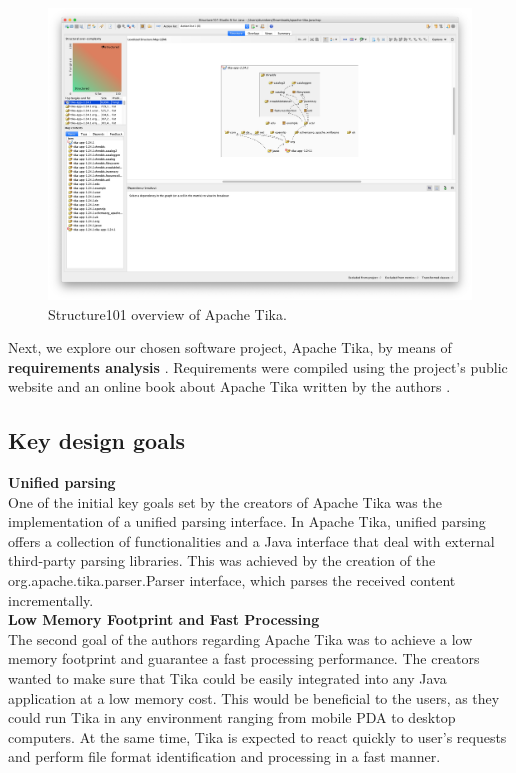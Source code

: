 \documentclass{article}
\begin{document}
\begin{figure}
    \centering
    \includegraphics[width=\textwidth]{structure101.png}
    \caption{Structure101 overview of Apache Tika.}
    \label{fig:structure101}
\end{figure}

Next, we explore our chosen software project, Apache Tika, by means of \textbf{requirements analysis} \citep{dresner1964maintenance}. Requirements were compiled using the project's public website \citep{apache_software_foundation_2020} and an online book about Apache Tika written by the authors \citep{tika_in_action}. 

\subsection{Key design goals}

\textbf{Unified parsing}\\

One of the initial key goals set by the creators of Apache Tika was the implementation of a unified parsing interface.  In Apache Tika, unified parsing offers a collection of functionalities and a Java interface that deal with external third-party parsing libraries. This was achieved by the creation of the org.apache.tika.parser.Parser interface, which parses the received content incrementally.\\

\textbf{Low Memory Footprint and Fast Processing}\\

The second goal of the authors regarding Apache Tika was to achieve a low memory footprint and guarantee a fast processing performance. The creators wanted to make sure that Tika could be easily integrated into any Java application at a low memory cost. This would be beneficial to the users, as they could run Tika in any environment ranging from mobile PDA to desktop computers. At the same time, Tika is expected to react quickly to user’s requests and perform file format identification and processing in a fast manner.\\
\end{document}
